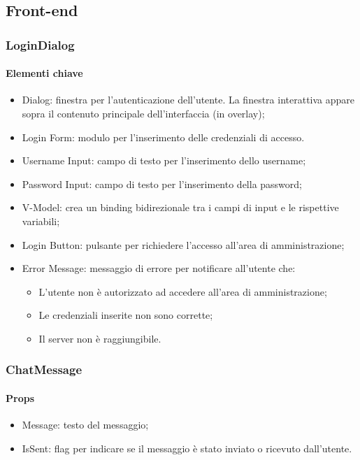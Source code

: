 \subsection{Front-end}

\subsubsection{LoginDialog}

\paragraph*{Elementi chiave}
\begin{itemize}
  \item Dialog: finestra per l'autenticazione dell'utente. La finestra interattiva appare sopra il contenuto principale dell'interfaccia (in overlay);
  \item Login Form: modulo per l'inserimento delle credenziali di accesso.
  \item Username Input: campo di testo per l'inserimento dello username;
  \item Password Input: campo di testo per l'inserimento della password;
  \item V-Model: crea un binding bidirezionale tra i campi di input e le rispettive variabili;
  \item Login Button: pulsante per richiedere l'accesso all'area di amministrazione;
  \item Error Message: messaggio di errore per notificare all'utente che:
  \begin{itemize}
    \item L'utente non è autorizzato ad accedere all'area di amministrazione;
    \item Le credenziali inserite non sono corrette;
    \item Il server non è raggiungibile.
  \end{itemize}
\end{itemize}

\subsubsection{ChatMessage}

\paragraph*{Props}
\begin{itemize}
  \item Message: testo del messaggio;
  \item IsSent: flag per indicare se il messaggio è stato inviato o ricevuto dall'utente.
\end{itemize}

